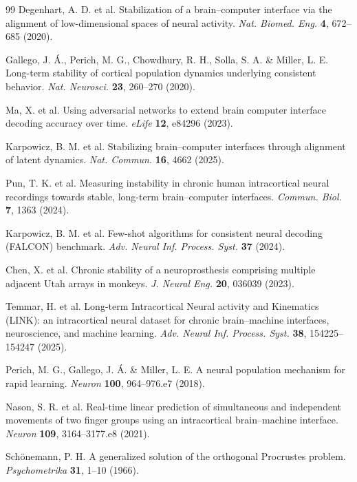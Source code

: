 \begin{thebibliography}{99}
 Degenhart, A. D. et al. Stabilization of a brain--computer interface via the alignment of low-dimensional spaces of neural activity. \textit{Nat. Biomed. Eng.} \textbf{4}, 672--685 (2020).

 Gallego, J. {\'A}., Perich, M. G., Chowdhury, R. H., Solla, S. A. \& Miller, L. E. Long-term stability of cortical population dynamics underlying consistent behavior. \textit{Nat. Neurosci.} \textbf{23}, 260--270 (2020).

 Ma, X. et al. Using adversarial networks to extend brain computer interface decoding accuracy over time. \textit{eLife} \textbf{12}, e84296 (2023).

 Karpowicz, B. M. et al. Stabilizing brain--computer interfaces through alignment of latent dynamics. \textit{Nat. Commun.} \textbf{16}, 4662 (2025).

 Pun, T. K. et al. Measuring instability in chronic human intracortical neural recordings towards stable, long-term brain--computer interfaces. \textit{Commun. Biol.} \textbf{7}, 1363 (2024).

 Karpowicz, B. M. et al. Few-shot algorithms for consistent neural decoding (FALCON) benchmark. \textit{Adv. Neural Inf. Process. Syst.} \textbf{37} (2024).

 Chen, X. et al. Chronic stability of a neuroprosthesis comprising multiple adjacent Utah arrays in monkeys. \textit{J. Neural Eng.} \textbf{20}, 036039 (2023).

 Temmar, H. et al. Long-term Intracortical Neural activity and Kinematics (LINK): an intracortical neural dataset for chronic brain--machine interfaces, neuroscience, and machine learning. \textit{Adv. Neural Inf. Process. Syst.} \textbf{38}, 154225--154247 (2025).

 Perich, M. G., Gallego, J. {\'A}. \& Miller, L. E. A neural population mechanism for rapid learning. \textit{Neuron} \textbf{100}, 964--976.e7 (2018).

 Nason, S. R. et al. Real-time linear prediction of simultaneous and independent movements of two finger groups using an intracortical brain--machine interface. \textit{Neuron} \textbf{109}, 3164--3177.e8 (2021).

 Sch{\"o}nemann, P. H. A generalized solution of the orthogonal Procrustes problem. \textit{Psychometrika} \textbf{31}, 1--10 (1966).


\end{thebibliography}
